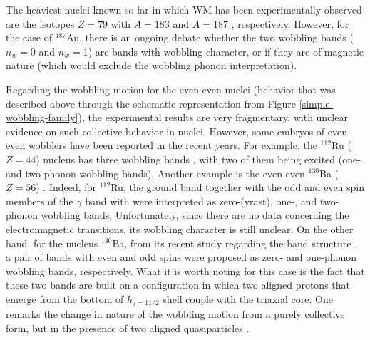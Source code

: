 \documentclass[11pt]{article}
\begin{document}
The heaviest nuclei known so far in which WM has been experimentally observed are the isotopes $Z=79$ with $A=183$ \cite{nandi2020first} and $A=187$ \cite{sensharma2020longitudinal}, respectively. However, for the case of $^{187}$Au, there is an ongoing debate \cite{guo2020risk} whether the two wobbling bands ($n_w=0$ and $n_w=1$) are bands with wobbling character, or if they are of magnetic nature (which would exclude the wobbling phonon interpretation).

Regarding the wobbling motion for the even-even nuclei (behavior that was described above through the schematic representation from Figure \ref{simple-wobbling-family}), the experimental results are very fragmentary, with unclear evidence on such collective behavior in nuclei. However, some embryos of even-even wobblers have been reported in the recent years. For example, the $^{112}$Ru ($Z=44$) nucleus has three wobbling bands \cite{hamilton2010super}, with two of them being excited (one- and two-phonon wobbling bands). Another example is the even-even $^{130}$Ba ($Z=56$) \cite{petrache2019diversity,wang2020two,chen2019transverse}. Indeed, for $^{112}$Ru, the ground band together with the odd and even spin members of the $\gamma$ band with were interpreted as zero-(yrast), one-, and two-phonon wobbling bands. Unfortunately, since there are no data concerning the electromagnetic transitions, its wobbling character is still unclear. On the other hand, for the nucleus $^{130}$Ba, from its recent study regarding the band structure \cite{petrache2019diversity}, a pair of bands with even and odd spins were proposed as zero- and one-phonon wobbling bands, respectively. What it is worth noting for this case is the fact that these two bands are built on a configuration in which two aligned protons that emerge from the bottom of $h_{j=11/2}$ shell couple with the triaxial core. One remarks the change in nature of the wobbling motion from a purely collective form, but in the presence of two aligned quasiparticles \cite{wang2020two}.
\end{document}
